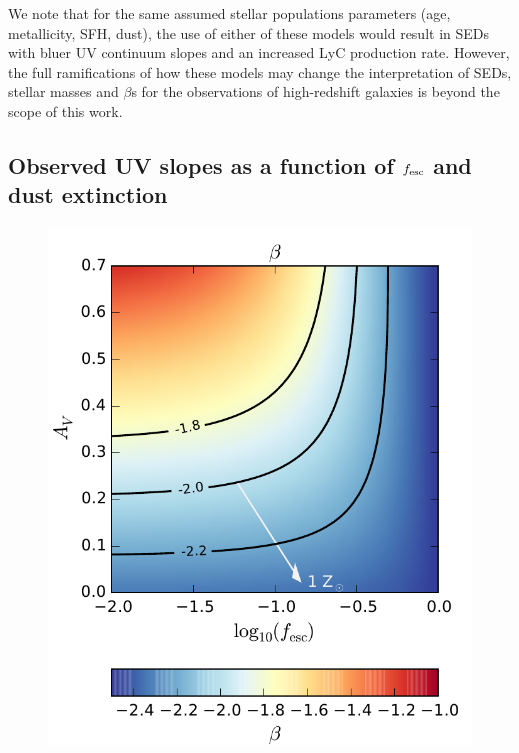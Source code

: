 We note that for the same assumed stellar populations parameters (age, metallicity, SFH, dust), the use of either of these models would result in SEDs with bluer UV continuum slopes and an increased LyC production rate. However, the full ramifications of how these models may change the interpretation of SEDs, stellar masses and $\beta$s for the observations of high-redshift galaxies is beyond the scope of this work. 

\subsection{Observed UV slopes as a function of $f_{\rm{esc}}$ and dust extinction}\label{reion-sec:slp}
\begin{landscape}
\begin{figure}
\centering
  \includegraphics[width=0.25\paperheight]{plots/Fig5a.pdf}

\end{figure}
\end{landscape}
